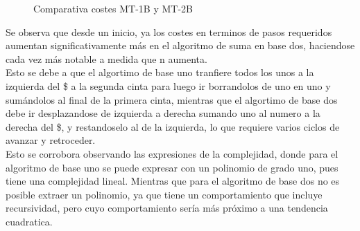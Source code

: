 \begin{figure}[h]
    \centering
    
    \caption{Comparativa costes MT-1B y MT-2B}
\end{figure}

Se observa que desde un inicio, ya los costes en terminos de pasos requeridos aumentan significativamente más en el algoritmo de suma en base dos, haciendose cada vez más notable a medida que n aumenta.\\ Esto se debe a que el algortimo de base uno tranfiere todos los unos a la izquierda del \$ a la segunda cinta para luego ir borrandolos de uno en uno y sumándolos al final de la primera cinta, mientras que el algortimo de base dos debe ir desplazandose de izquierda a derecha sumando uno al numero a la derecha del \$, y restandoselo al de la izquierda, lo que requiere varios ciclos de avanzar y retroceder.\\
Esto se corrobora observando las expresiones de la complejidad, donde para el algoritmo de base uno se puede expresar con un polinomio de grado uno, pues tiene una complejidad lineal. Mientras que para el algoritmo de base dos no es posible extraer un polinomio, ya que tiene un comportamiento que incluye recursividad, pero cuyo comportamiento sería más próximo a una tendencia cuadratica.
